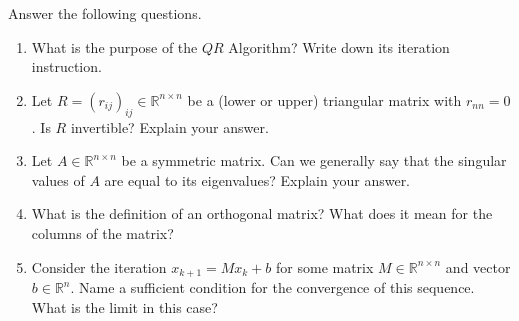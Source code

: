 Answer the following questions.
\begin{enumerate}
	\item What is the purpose of the $QR$ Algorithm? Write down its iteration instruction.
	\item Let $R=(r_{ij})_{ij} \in \mathbb{R}^{n \times n}$ be a (lower or upper) triangular matrix with $r_{nn} = 0$. Is $R$ invertible? Explain your answer.			
	\item Let $A \in \mathbb{R}^{n \times n}$ be a symmetric matrix. Can we generally say that the singular values of $A$ are equal to its eigenvalues? Explain your answer.		
	\item What is the definition of an orthogonal matrix? What does it mean for the columns of the matrix?
	\item Consider the iteration $x_{k+1} = Mx_k + b$ for some matrix $M \in \mathbb{R}^{n \times n}$ and vector $b \in \mathbb{R}^n$. Name a sufficient condition for the convergence of this sequence. What is the limit in this case?
\end{enumerate}
